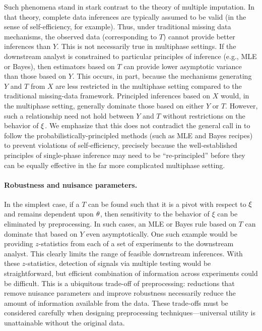 Such phenomena stand in stark contrast to the theory of multiple imputation.
In that theory, complete data inferences are typically assumed to be valid (in the sense of self-efficiency, for example).
Thus, under traditional missing data mechanisms, the observed data (corresponding to $T$) cannot provide better inferences than $Y$.
This is not necessarily true in multiphase settings.
If the downstream analyst is constrained to particular principles of inference (e.g., MLE or Bayes), then estimators based on $T$ can provide lower asymptotic variance than those based on $Y$.
This occurs, in part, because the mechanisms generating $Y$ and $T$ from $X$ are less restricted in the multiphase setting compared to the traditional missing-data framework.
Principled inferences based on $X$ would, in the multiphase setting, generally dominate those based on either $Y$ or $T$.
However, such a relationship need not hold between $Y$ and $T$ without restrictions on the behavior of $\xi$.
We emphasize that this does not contradict the general call in \citet{Meng2012} to follow the probabilistically-principled methods (such as MLE and Bayes recipes) to prevent violations of self-efficiency, precisely because the well-established principles of single-phase inference may need to be ``re-principled'' before they can be equally effective in the far more complicated multiphase setting.   

\paragraph{Robustness and nuisance parameters.}
In the simplest case, if a $T$ can be found such that it is a pivot with respect to $\xi$ and remains dependent upon $\theta$, then sensitivity to the behavior of $\xi$ can be eliminated by preprocessing.
In such cases, an MLE or Bayes rule based on $T$ can dominate that based on $Y$ even asymptotically.
One such example would be providing $z$-statistics from each of a set of experiments to the downstream analyst.
This clearly limits the range of feasible downstream inferences.
With these $z$-statistics, detection of signals via multiple testing \citep[e.g.,][]{Benjamini1995} would be straightforward, but efficient combination of information across experiments could be difficult.
This is a ubiquitous trade-off of preprocessing: reductions that remove nuisance parameters and improve robustness necessarily reduce the amount of information available from the data.
These trade-offs must be considered carefully when designing preprocessing techniques---universal utility is unattainable without  the original data.

